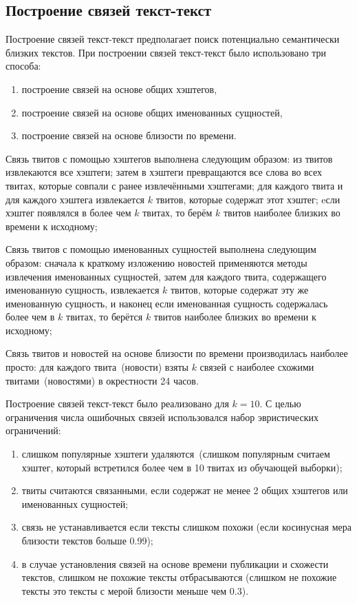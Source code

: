 \subsection{Построение связей текст-текст}
    Построение связей текст-текст предполагает поиск потенциально семантически близких текстов.
    При построении связей текст-текст было использовано три способа:
    \begin{enumerate}
        \item построение связей на основе общих хэштегов,
        \item построение связей на основе общих именованных сущностей,
        \item построение связей на основе близости по времени.
    \end{enumerate}

    Связь твитов с помощью хэштегов выполнена следующим образом:
        из твитов извлекаются все хэштеги;
        затем в хэштеги превращаются все слова во всех твитах, которые совпали с ранее извлечёнными хэштегами;
        для каждого твита и для каждого хэштега извлекается $k$ твитов, которые содержат этот хэштег;
        eсли хэштег появлялся в более чем $k$ твитах, то берём $k$ твитов наиболее близких во времени к исходному;

    Связь твитов с помощью именованных сущностей выполнена следующим образом:
        сначала к краткому изложению новостей применяются методы извлечения именованных сущностей,
        затем для каждого твита, содержащего именованную сущность, извлекается $k$ твитов, которые содержат эту же именованную сущность,
        и наконец если именованная сущность содержалась более чем в $k$ твитах, то берётся $k$ твитов наиболее близких во времени к исходному;

    Связь твитов и новостей на основе близости по времени производилась наиболее просто:
        для каждого твита~(новости) взяты $k$ связей с наиболее схожими твитами~(новостями) в окрестности 24 часов.

    Построение связей текст-текст было реализовано для $k=10$. С целью ограничения числа ошибочных связей использовался набор эвристических ограничений:
    \begin{enumerate}
        \item слишком популярные хэштеги удаляются~(слишком популярным считаем хэштег, который встретился более чем в 10 твитах из обучающей выборки);
        \item твиты считаются связанными, если содержат не менее 2 общих хэштегов или именованных сущностей;
        \item связь не устанавливается если тексты слишком похожи (если косинусная мера близости текстов больше 0.99);
        \item в случае установления связей на основе времени публикации и схожести текстов, слишком не похожие тексты отбрасываются
        (слишком не похожие тексты это тексты с мерой близости меньше чем 0.3).
    \end{enumerate}

